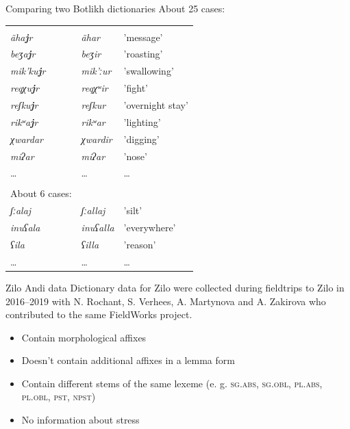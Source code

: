 \documentclass[13pt, t]{beamer}
\begin{document}
\begin{frame}{Comparing two Botlikh dictionaries}
About 25 cases:\\

\begin{tabular}{lll}
\citep{alekseev2019} &\citep{saidovaabusov2012} & \\
\textit{ãha\textbf{\underline{j}}r}   & \textit{ãhar}   & 'message’        \\
\textit{beʒa\textbf{\underline{j}}r}   & \textit{beʒir}   & 'roasting’       \\
\textit{mik'ku\textbf{\underline{j}}r} & \textit{mik'ːur} & 'swallowing’     \\
\textit{reqχu\textbf{\underline{j}}r}  & \textit{reqχʷir} & 'fight’          \\
\textit{reʃku\textbf{\underline{j}}r}  & \textit{reʃkur}  & 'overnight stay’ \\
\textit{rikʷa\textbf{\underline{j}}r}  & \textit{rikʷar} & 'lighting’     \\ \hline
\textit{χwardar} & \textit{χwardir} & 'digging' \\
\textit{miʔar} & \textit{miʔar} & 'nose'\\ 
\dots & \dots & \dots \\ 
& & \\
About 6 cases: & & \\
\textit{ʃːalaj} & \textit{ʃːallaj} & 'silt' \\
\textit{inuʕala} & \textit{inuʕalla} & 'everywhere' \\
\textit{ʕila} & \textit{ʕilla} & 'reason' \\
\dots & \dots & \dots \\
\end{tabular}
\end{frame}



\begin{frame}{Zilo Andi data}
Dictionary data for Zilo were collected during fieldtrips to Zilo in 2016--2019 with N. Rochant, S. Verhees, A. Martynova and A. Zakirova who contributed to the same FieldWorks project.
\begin{itemize}
\item Contain morphological affixes
\item Doesn't contain additional affixes in a lemma form
\item Contain different stems of the same lexeme (e. g. \textsc{sg.abs, sg.obl, pl.abs, pl.obl, pst, npst})
\item No information about stress
\end{itemize}
\end{frame}
\end{document}
